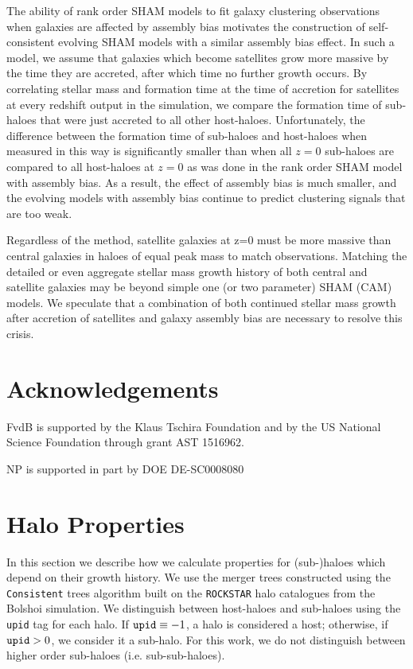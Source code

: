 \documentclass[a4paper,fleqn,usenatbib]{mnras}
\begin{document}
The ability of rank order SHAM models to fit galaxy clustering observations when galaxies are affected by assembly bias motivates the construction of self-consistent evolving SHAM models with a similar assembly bias effect.  In such a model, we assume that galaxies which become satellites grow more massive by the time they are accreted, after which time no further growth occurs.  By correlating stellar mass and formation time at the time of accretion for satellites at every redshift output in the simulation, we compare the formation time of sub-haloes that were just accreted to all other host-haloes.  Unfortunately, the difference between the formation time of sub-haloes and host-haloes when measured in this way is significantly smaller than when all $z=0$ sub-haloes are compared to all host-haloes at $z=0$ as was done in the rank order SHAM model with assembly bias.  As a result, the effect of assembly bias is much smaller, and the evolving models with assembly bias continue to predict clustering signals that are too weak.  

Regardless of the method, satellite galaxies at z=0 must be more massive than central galaxies in haloes of equal peak mass to match observations.  Matching the detailed or even aggregate stellar mass growth history of both central and satellite galaxies may be beyond simple one (or two parameter) SHAM (CAM) models.  We speculate that a combination of both continued stellar mass growth after accretion of satellites and galaxy assembly bias are necessary to resolve this crisis.


\section*{Acknowledgements}

FvdB is supported by the Klaus Tschira Foundation and by the US National Science Foundation through grant AST 1516962.

NP is supported in part by DOE DE-SC0008080

%

 

\appendix

\section{Halo Properties}
\label{sec:halo_properties}

In this section we describe how we calculate properties for (sub-)haloes which depend on their growth history.  We use the merger trees constructed using the {\tt Consistent} trees algorithm \citep{Behroozi:2013dz} built on the {\tt ROCKSTAR} halo catalogues from the Bolshoi simulation.  We distinguish between host-haloes and sub-haloes using the {\tt upid} tag for each halo.  If $ {\tt upid} \equiv -1$, a halo is considered a host; otherwise, if ${\tt upid} > 0$, we consider it a sub-halo.  For this work, we do not distinguish between higher order sub-haloes (i.e. sub-sub-haloes).
\end{document}

